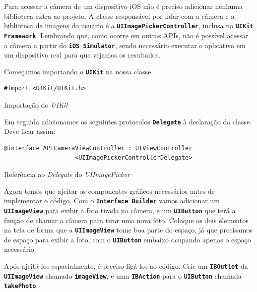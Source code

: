 \documentclass[a4paper,12pt,brazil,doubleside]{book}
\begin{document}
\begin{singlespace}
Para acessar a câmera de um dispositivo iOS não é preciso adicionar nenhuma biblioteca extra ao projeto. A classe responsável por lidar com a câmera e a biblioteca de imagens do usuário é a \texttt{\textbf{UIImagePickerController}}, inclusa no \texttt{\textbf{UIKit Framework}}. Lembrando que, como ocorre em outras APIs, não é possível acessar a câmera a partir do \texttt{\textbf{iOS Simulator}}, sendo necessário executar o aplicativo em um dispositivo real para que vejamos os resultados.

Começamos importando o \texttt{\textbf{UIKit}} na nossa classe.

\begin{listing}[H]
\begin{verbatim}
#import <UIKit/UIKit.h>
\end{verbatim}
\caption{Importação do \emph{UIKit}}
\end{listing}


Em seguida adicionamos os seguintes protocolos \texttt{\textbf{Delegate}} à declaração da classe. Deve ficar assim:

\begin{listing}[H]
\begin{verbatim}
@interface APICameraViewController : UIViewController
                    <UIImagePickerControllerDelegate>
\end{verbatim}
\caption{Referência ao \emph{Delegate} do \emph{UIImagePicker}}
\end{listing}


Agora temos que ajeitar os componentes gráficos necessários antes de implementar o código. Com o \texttt{\textbf{Interface Builder}} vamos adicionar um \texttt{\textbf{UIImageView}} para exibir a foto tirada na câmera, e um \texttt{\textbf{UIButton}} que terá a função de chamar a câmera para tirar uma nova foto. Coloque os dois elementos na tela de forma que a \texttt{\textbf{UIImageView}} tome boa parte do espaço, já que precisamos de espaço para exibir a foto, com o \texttt{\textbf{UIButton}} embaixo ocupando apenas o espaço necessário.

Após ajeitá-los espacialmente, é preciso ligá-los ao código. Crie um \texttt{\textbf{IBOutlet}} da \texttt{\textbf{UIImageView}} chamado \texttt{\textbf{imageView}}, e uma \texttt{\textbf{IBAction}} para o \texttt{\textbf{UIButton}} chamada \texttt{\textbf{takePhoto}}.


\end{singlespace}
\end{document}
